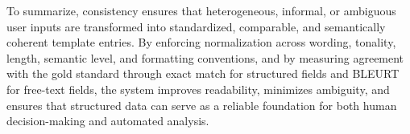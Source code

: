 To summarize, consistency ensures that heterogeneous, informal, or ambiguous user inputs are transformed into standardized, comparable, and semantically coherent template entries. By enforcing normalization across wording, tonality, length, semantic level, and formatting conventions, and by measuring agreement with the gold standard through exact match for structured fields and BLEURT for free-text fields, the system improves readability, minimizes ambiguity, and ensures that structured data can serve as a reliable foundation for both human decision-making and automated analysis.  
